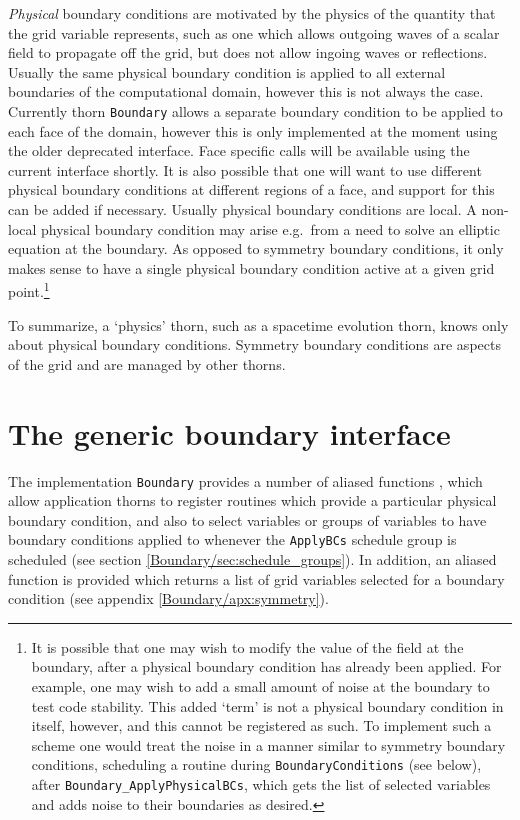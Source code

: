 \documentclass{article}
\begin{document}
\emph{Physical} boundary conditions are motivated by the physics of
the quantity that the grid variable represents, such as one which
allows outgoing waves of a scalar field to propagate off the grid, but
does not allow ingoing waves or reflections.  Usually the same
physical boundary condition is applied to all external boundaries of
the computational domain, however this is not always the case.
Currently thorn \texttt{Boundary} allows a separate boundary condition to be
applied to each face of the domain, however this is only implemented
at the moment using the older deprecated interface.  Face specific
calls will be available using the current interface shortly.  It is
also possible that one will want to use different physical boundary
conditions at different regions of a face, and support for this can be
added if necessary.  Usually physical boundary conditions are local.
A non-local physical boundary condition may arise e.g.~from a need to
solve an elliptic equation at the boundary.  As opposed to symmetry
boundary conditions, it only makes sense to have a single physical
boundary condition active at a given grid point.\footnote{It is
possible that one may wish to modify the value of the field at the
boundary, after a physical boundary condition has already been
applied.  For example, one may wish to add a small amount of noise at
the boundary to test code
stability.  This added `term' is not a physical boundary condition in
itself, however, and this cannot be registered as such.  To implement
such a scheme one would treat the noise in a manner similar to
symmetry boundary conditions, scheduling a routine during
\texttt{BoundaryConditions} (see below), after \texttt{Boundary\_ApplyPhysicalBCs},
which gets the list of selected variables and adds noise to their
boundaries as desired.}

To summarize, a `physics' thorn, such as a spacetime evolution thorn,
knows only about physical boundary conditions.  Symmetry boundary
conditions are aspects of the grid and are managed by other thorns.


\section{The generic boundary interface}

The implementation \texttt{Boundary} provides a number of aliased
functions%
, which allow application thorns to
register routines which provide a particular physical boundary
condition, and also to select variables or groups of variables to have
boundary conditions applied to whenever the \texttt{ApplyBCs} schedule
group is scheduled (see section \ref{Boundary/sec:schedule_groups}).  In addition,
an aliased function is provided which returns a list of grid variables
selected for a boundary condition (see appendix \ref{Boundary/apx:symmetry}).
\end{document}
